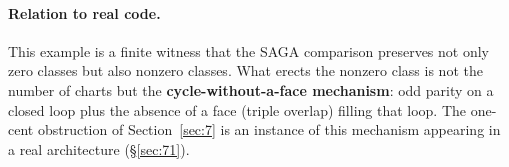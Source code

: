 \begin{example}
\paragraph{Relation to real code.}
This example is a finite witness that the SAGA comparison preserves
not only zero classes but also nonzero classes. What erects the
nonzero class is not the number of charts but the
\textbf{cycle-without-a-face mechanism}: odd parity on a closed loop
plus the absence of a face (triple overlap) filling that loop. The
one-cent obstruction of Section~\ref{sec:7} is an instance of this
mechanism appearing in a real architecture (\S\ref{sec:71}).
\end{example}
